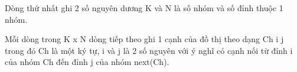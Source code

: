 Dòng thứ nhất ghi 2 số nguyên dương K và N là số nhóm và số đỉnh thuộc 1 nhóm.  

   Mỗi dòng trong K x N dòng tiếp theo ghi 1 cạnh của đồ thị theo dạng Ch i j trong đó Ch là một ký tự, i và j là 2 số nguyên với ý nghĩ có cạnh nối từ đỉnh i của nhóm Ch đến đỉnh j của nhóm next(Ch).  

\